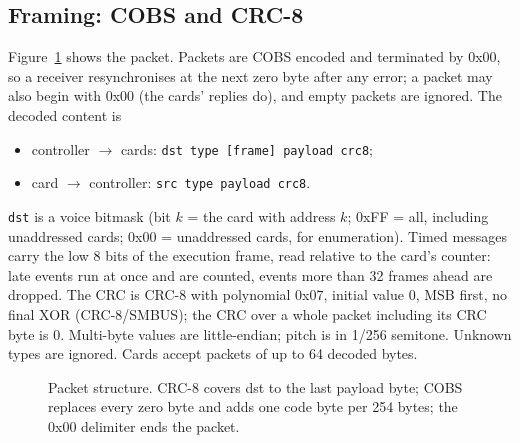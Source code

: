\documentclass[11pt,a4paper]{article}
\begin{document}
\subsection{Framing: COBS and CRC-8}
Figure~\ref{fig:packet} shows the packet. Packets are COBS encoded and terminated by 0x00, so a receiver
resynchronises at the next zero byte after any error; a packet may also begin with 0x00 (the cards' replies do), and
empty packets are ignored. The decoded content is
\begin{itemize}
  \item controller $\to$ cards: \texttt{dst type [frame] payload crc8};
  \item card $\to$ controller: \texttt{src type payload crc8}.
\end{itemize}
\texttt{dst} is a voice bitmask (bit $k$ = the card with address $k$; 0xFF = all, including unaddressed cards;
0x00 = unaddressed cards, for enumeration). Timed messages carry the low 8 bits of the execution frame, read relative
to the card's counter: late events run at once and are counted, events more than 32 frames ahead are dropped. The
CRC is CRC-8 with polynomial 0x07, initial value 0, MSB first, no final XOR (CRC-8/SMBUS); the CRC over a whole packet
including its CRC byte is 0. Multi-byte values are little-endian; pitch is in 1/256 semitone. Unknown types are ignored.
Cards accept packets of up to 64 decoded bytes.

\begin{figure}[htbp]
\centering
{}
\caption{Packet structure. CRC-8 covers dst to the last payload byte; COBS replaces every zero byte and adds one code
byte per 254 bytes; the 0x00 delimiter ends the packet.}
\label{fig:packet}
\end{figure}
\end{document}

